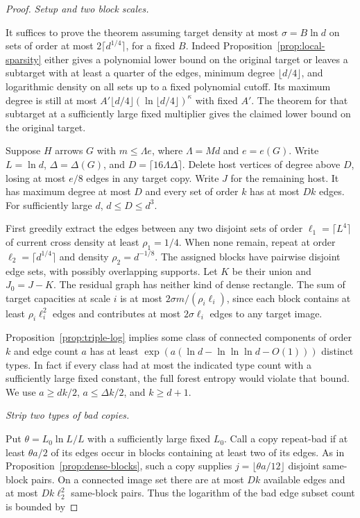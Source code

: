\documentclass[11pt]{amsart}
\theoremstyle{definition}
\theoremstyle{remark}
\numberwithin{equation}{section}
\begin{document}
\begin{proof}

\medskip\noindent\emph{Setup and two block scales.}

It suffices to prove the theorem assuming target density at most $\sigma=B\ln d $ on sets of order at most $2\lceil d^{1/4}\rceil $, for a fixed $ B $. Indeed Proposition~\ref{prop:local-sparsity} either gives a polynomial lower bound on the original target or leaves a subtarget with at least a quarter of the edges, minimum degree $\lfloor d/4\rfloor $, and logarithmic density on all sets up to a fixed polynomial cutoff. Its maximum degree is still at most $ A'\lfloor d/4\rfloor(\ln\lfloor d/4\rfloor)^\kappa $ with fixed $ A'$. The theorem for that subtarget at a sufficiently large fixed multiplier gives the claimed lower bound on the original target.

Suppose $H $ arrows $ G $ with $ m\le\Lambda e $, where $\Lambda=Md $ and $ e=e(G)$. Write $ L=\ln d $, $\Delta=\Delta(G)$, and $ D=\lceil16\Lambda\Delta\rceil $. Delete host vertices of degree above $ D $, losing at most $ e/8$ edges in any target copy. Write $ J $ for the remaining host. It has maximum degree at most $ D $ and every set of order $ k $ has at most $ Dk $ edges. For sufficiently large $ d $, $ d\le D\le d^3$.

First greedily extract the edges between any two disjoint sets of order $\ell_1=\lceil L^4\rceil $ of current cross density at least $\rho_1=1/4$. When none remain, repeat at order $\ell_2=\lceil d^{1/4}\rceil $ and density $\rho_2=d^{-1/8}$. The assigned blocks have pairwise disjoint edge sets, with possibly overlapping supports. Let $ K $ be their union and $ J_0=J-K $. The residual graph has neither kind of dense rectangle. The sum of target capacities at scale $ i $ is at most $2\sigma m/(\rho_i\ell_i)$, since each block contains at least $\rho_i\ell_i^2$ edges and contributes at most $2\sigma\ell_i$ edges to any target image.

Proposition~\ref{prop:triple-log} implies some class of connected components of order $k $ and edge count $ a $ has at least $\exp(a(\ln d-\ln\ln\ln d-O(1)))$ distinct types. In fact if every class had at most the indicated type count with a sufficiently large fixed constant, the full forest entropy would violate that bound. We use $ a\ge dk/2$, $ a\le\Delta k/2$, and $ k\ge d+1$.

\medskip\noindent\emph{Strip two types of bad copies.}

Put $\theta=L_0\ln L/L $ with a sufficiently large fixed $ L_0$. Call a copy repeat-bad if at least $\theta a/2$ of its edges occur in blocks containing at least two of its edges. As in Proposition~\ref{prop:dense-blocks}, such a copy supplies $ j=\lfloor\theta a/12\rfloor $ disjoint same-block pairs. On a connected image set there are at most $ Dk $ available edges and at most $ Dk\ell_2^2$ same-block pairs. Thus the logarithm of the bad edge subset count is bounded by


\end{proof}
\end{document}
